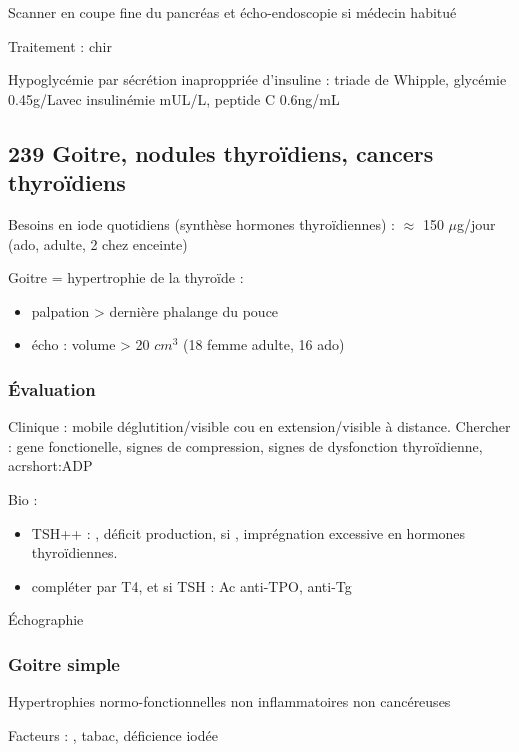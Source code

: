 \documentclass[11pt]{article}
\begin{document}
Scanner en coupe fine du pancréas et écho-endoscopie si médecin habitué

Traitement : chir

\begin{tcolorbox}
Hypoglycémie par sécrétion inaproppriée d'insuline : triade de Whipple, glycémie \le 0.45g/L\footnotemark avec
insulinémie  mUL/L, peptide C \ge 0.6ng/mL
\end{tcolorbox}

\subsection{239 \textdagger{} Goitre, nodules thyroïdiens, cancers thyroïdiens}
\label{sec:orgef116d6}
Besoins en iode quotidiens (synthèse hormones thyroïdiennes) :  \(\approx\) 150 \(\mu\)g/jour (ado,
  adulte, \texttimes{} 2 chez enceinte)

Goitre = hypertrophie de la thyroïde :
\begin{itemize}
\item palpation > dernière phalange du pouce
\item écho : volume > 20 \(cm^3\) (18 femme adulte, 16 ado)
\end{itemize}

\subsubsection{Évaluation}
\label{sec:org941809e}
Clinique : mobile déglutition/visible cou en extension/visible à
distance. Chercher : gene fonctionelle, signes de compression, signes de
dysfonction thyroïdienne, acrshort:ADP

Bio : 
\begin{itemize}
\item TSH++ : \inc, déficit production, si \dec, imprégnation excessive en hormones thyroïdiennes.
\item compléter par T4, et si TSH \inc : Ac anti-TPO, anti-Tg
\end{itemize}

Échographie

\subsubsection{Goitre simple}
\label{sec:org20569b9}
Hypertrophies normo-fonctionnelles non inflammatoires non cancéreuses

Facteurs : \female, tabac, déficience iodée
\end{document}
